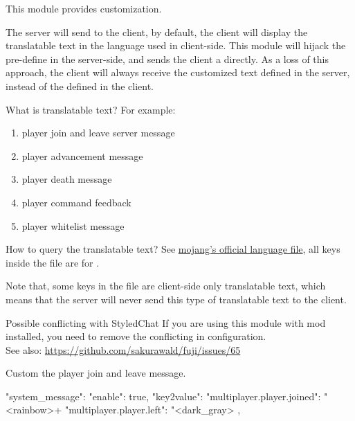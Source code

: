 
This module provides  customization.

The server will send  to the client, by default, the client will display the translatable text in the language used in client-side.
This module will hijack the pre-define  in the server-side, and sends the client a  directly.
As a loss of this approach, the client will always receive the customized text defined in the server, instead of the  defined in the client.

\begin{note}{What is translatable text?}
    For example:
    \begin{enumerate}
        \item player join and leave server message
        \item player advancement message
        \item player death message
        \item player command feedback
        \item player whitelist message
    \end{enumerate}
\end{note}

\begin{note}{How to query the translatable text?}
    See \href{https://github.com/sakurawald/fuji/blob/dev/.github/files/en_us.json}{mojang's official language file}, all keys inside the file are for .

    Note that, some keys in the file are client-side only translatable text, which means that the server will never send this type of translatable text to the client.
\end{note}

\begin{warn}{Possible conflicting with StyledChat}
    If you are using this module with  mod installed, you need to remove the conflicting  in  configuration. \\
    See also: \url{https://github.com/sakurawald/fuji/issues/65}
\end{warn}


\begin{example}{Custom the player join and leave message.}
    \begin{json}
        "system_message": {
            "enable": true,
            "key2value": {
                "multiplayer.player.joined": "<rainbow>+ %
                "multiplayer.player.left": "<dark_gray>%
            }
        },
    \end{json}

\end{example}

